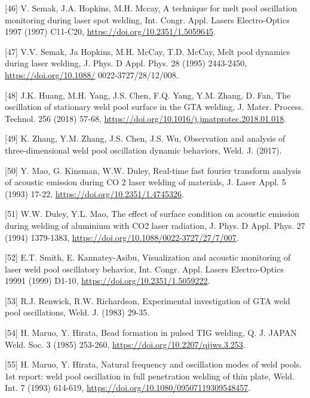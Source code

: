\documentclass[10pt]{article}
\begin{document}
[46] V. Semak, J.A. Hopkins, M.H. Mccay, A technique for melt pool oscillation monitoring during laser spot welding, Int. Congr. Appl. Lasers Electro-Optics 1997 (1997) C11-C20, \href{https://doi.org/10.2351/1.5059645}{https://doi.org/10.2351/1.5059645}.

[47] V.V. Semak, Ja Hopkins, M.H. McCay, T.D. McCay, Melt pool dynamics during laser welding, J. Phys. D Appl. Phys. 28 (1995) 2443-2450, \href{https://doi.org/10.1088/}{https://doi.org/10.1088/} 0022-3727/28/12/008.

[48] J.K. Huang, M.H. Yang, J.S. Chen, F.Q. Yang, Y.M. Zhang, D. Fan, The oscillation of stationary weld pool surface in the GTA welding, J. Mater. Process. Technol. 256 (2018) 57-68, \href{https://doi.org/10.1016/j.jmatprotec.2018.01.018}{https://doi.org/10.1016/j.jmatprotec.2018.01.018}.

[49] K. Zhang, Y.M. Zhang, J.S. Chen, J.S. Wu, Observation and analysis of three-dimensional weld pool oscillation dynamic behaviors, Weld. J. (2017).

[50] Y. Mao, G. Kinsman, W.W. Duley, Real-time fast fourier transform analysis of acoustic emission during CO 2 laser welding of materials, J. Laser Appl. 5 (1993) 17-22, \href{https://doi.org/10.2351/1.4745326}{https://doi.org/10.2351/1.4745326}.

[51] W.W. Duley, Y.L. Mao, The effect of surface condition on acoustic emission during welding of aluminium with CO2 laser radiation, J. Phys. D Appl. Phys. 27 (1994) 1379-1383, \href{https://doi.org/10.1088/0022-3727/27/7/007}{https://doi.org/10.1088/0022-3727/27/7/007}.

[52] E.T. Smith, E. Kannatey-Asibu, Visualization and acoustic monitoring of laser weld pool oscillatory behavior, Int. Congr. Appl. Lasers Electro-Optics 19991 (1999) D1-10, \href{https://doi.org/10.2351/1.5059222}{https://doi.org/10.2351/1.5059222}.

[53] R.J. Renwick, R.W. Richardson, Experimental investigation of GTA weld pool oscillations, Weld. J. (1983) 29-35.

[54] H. Maruo, Y. Hirata, Bead formation in pulsed TIG welding, Q. J. JAPAN Weld. Soc. 3 (1985) 253-260, \href{https://doi.org/10.2207/qjjws.3.253}{https://doi.org/10.2207/qjjws.3.253}.

[55] H. Maruo, Y. Hirata, Natural frequency and oscillation modes of weld pools. 1st report: weld pool oscillation in full penetration welding of thin plate, Weld. Int. 7 (1993) 614-619, \href{https://doi.org/10.1080/09507119309548457}{https://doi.org/10.1080/09507119309548457}.
\end{document}
